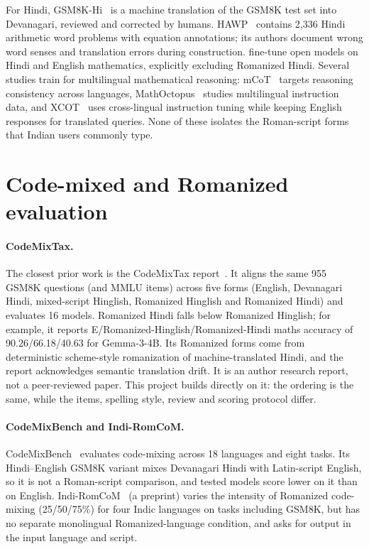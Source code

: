 \documentclass[12pt,a4paper,oneside]{report}
\renewcommand{\_}{\oldunderscore\allowbreak}
\begin{document}
For Hindi, GSM8K-Hi~\citep{kamath-etal-2025-benchmarking} is a machine translation of the GSM8K test set into Devanagari, reviewed and corrected by humans. HAWP~\citep{sharma-etal-2022-hawp} contains 2,336 Hindi arithmetic word problems with equation annotations; its authors document wrong word senses and translation errors during construction. \citet{anand-etal-2025-multilingual} fine-tune open models on Hindi and English mathematics, explicitly excluding Romanized Hindi. Several studies train for multilingual mathematical reasoning: mCoT~\citep{lai-nissim-2024-mcot} targets reasoning consistency across languages, MathOctopus~\citep{chen-etal-2024-breaking} studies multilingual instruction data, and XCOT~\citep{chai-etal-2025-xcot} uses cross-lingual instruction tuning while keeping English responses for translated queries. None of these isolates the Roman-script forms that Indian users commonly type.

\section{Code-mixed and Romanized evaluation}

\paragraph{CodeMixTax.} The closest prior work is the CodeMixTax report~\citep{sthanika-2026-codemix}. It aligns the same 955 GSM8K questions (and MMLU items) across five forms (English, Devanagari Hindi, mixed-script Hinglish, Romanized Hinglish and Romanized Hindi) and evaluates 16 models. Romanized Hindi falls below Romanized Hinglish; for example, it reports E/Romanized-Hinglish/Romanized-Hindi maths accuracy of 90.26/66.18/40.63 for Gemma-3-4B. Its Romanized forms come from deterministic scheme-style romanization of machine-translated Hindi, and the report acknowledges semantic translation drift. It is an author research report, not a peer-reviewed paper. This project builds directly on it: the ordering is the same, while the items, spelling style, review and scoring protocol differ.

\paragraph{CodeMixBench and Indi-RomCoM.} CodeMixBench~\citep{yang-chai-2025-codemixbench} evaluates code-mixing across 18 languages and eight tasks. Its Hindi--English GSM8K variant mixes Devanagari Hindi with Latin-script English, so it is not a Roman-script comparison, and tested models score lower on it than on English. Indi-RomCoM~\citep{das-etal-2026-indiromcom} (a preprint) varies the intensity of Romanized code-mixing (25/50/75\%) for four Indic languages on tasks including GSM8K, but has no separate monolingual Romanized-language condition, and asks for output in the input language and script.
\end{document}
